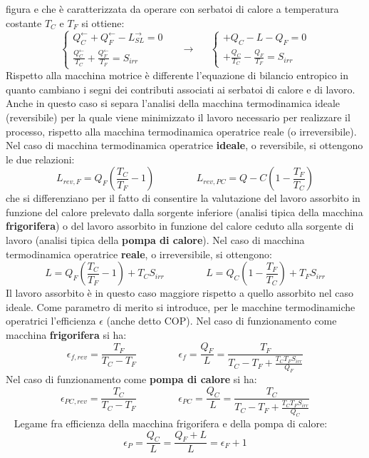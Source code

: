 figura e che è caratterizzata da operare con serbatoi di calore a temperatura costante $T_C$ e $T_F$ si
ottiene:
\[
    \begin{cases}
        Q_C^\leftarrow  + Q_F^\leftarrow  - L_{SL}^\rightarrow  = 0\\
        \frac{Q_C^\leftarrow}{T_C} + \frac{Q_F^\leftarrow}{T_F} = S_{irr}
    \end{cases} \;\;\;\;\;\longrightarrow\;\;\;\;\;\begin{cases}
        +Q_C - L - Q_F = 0\\
        + \frac{Q_C}{T_C} - \frac{Q_F}{T_F} = S_{irr}
    \end{cases}
\]
Rispetto alla macchina motrice è differente l’equazione di bilancio entropico in quanto
cambiano i segni dei contributi associati ai serbatoi di calore e di lavoro.\newline
\newline
Anche in questo caso si separa l’analisi della macchina termodinamica ideale (reversibile) per
la quale viene minimizzato il lavoro necessario per realizzare il processo, rispetto alla
macchina termodinamica operatrice reale (o irreversibile). \newline
Nel caso di macchina termodinamica operatrice \textbf{ideale}, o reversibile, si ottengono le due
relazioni: 
\[
    L_{rev,F} = Q_F\left(\frac{T_C}{T_F}-1\right) \;\;\;\;\;\;\;\;\;\;\;\;\;\;\; L_{rev,PC} = Q-C \left(1- \frac{T_F}{T_C}\right)
\]
che si differenziano per il fatto di consentire la valutazione del lavoro assorbito in funzione
del calore prelevato dalla sorgente inferiore (analisi tipica della macchina \textbf{frigorifera}) o del
lavoro assorbito in funzione del calore ceduto alla sorgente di lavoro (analisi tipica della
\textbf{pompa di calore}).
\newline
\newline
Nel caso di macchina termodinamica operatrice \textbf{reale}, o irreversibile, si ottengono: 
\[
    L = Q_F\left(\frac{T_C}{T_F}-1\right) + T_C S_{irr} \;\;\;\;\;\;\;\;\;\;\;\;\;\;\; L = Q_C \left(1- \frac{T_F}{T_C}\right) + T_F S_{irr}
\]
Il lavoro assorbito è in questo caso maggiore rispetto a quello assorbito nel caso ideale. \newline
\newline
Come parametro di merito si introduce, per le macchine termodinamiche operatrici
l’efficienza $\epsilon$ (anche detto COP). \newline
\newline
Nel caso di funzionamento come macchina \textbf{frigorifera} si ha: 
\[
    \epsilon_{f,rev} = \frac{T_F}{T_C-T_F} \;\;\;\;\;\;\;\;\;\;\;\;\;\;\; \epsilon_{f} = \frac{Q_F}{L} = \frac{T_F}{T_C-T_F + \frac{T_CT_FS_{irr}}{Q_F}}
\]
Nel caso di funzionamento come \textbf{pompa di calore} si ha:
\[
    \epsilon_{PC, rev} = \frac{T_C}{T_C-T_F} \;\;\;\;\;\;\;\;\;\;\;\;\;\;\; \epsilon_{PC} = \frac{Q_C}{L} = \frac{T_C}{T_C-T_F + \frac{T_CT_FS_{irr}}{Q_C}}
\]
\ \newline
Legame fra efficienza della macchina frigorifera e della pompa di calore:
\[
    \epsilon_P = \frac{Q_C}{L} = \frac{Q_F + L}{L} = \epsilon_F +1
\]
